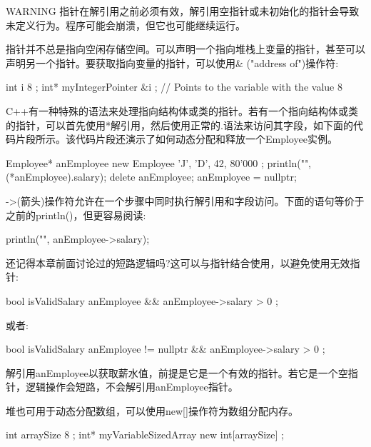 \begin{myWarning}{WARNING}
指针在解引用之前必须有效，解引用空指针或未初始化的指针会导致未定义行为。程序可能会崩溃，但它也可能继续运行。
\end{myWarning}

指针并不总是指向空闲存储空间。可以声明一个指向堆栈上变量的指针，甚至可以声明另一个指针。要获取指向变量的指针，可以使用\& ("address of")操作符:

\begin{cpp}
int i { 8 };
int* myIntegerPointer { &i }; // Points to the variable with the value 8
\end{cpp}

C++有一种特殊的语法来处理指向结构体或类的指针。若有一个指向结构体或类的指针，可以首先使用*解引用，然后使用正常的.语法来访问其字段，如下面的代码片段所示。该代码片段还演示了如何动态分配和释放一个Employee实例。

\begin{cpp}
Employee* anEmployee { new Employee { 'J', 'D', 42, 80'000 } };
println("{}", (*anEmployee).salary);
delete anEmployee; anEmployee = nullptr;
\end{cpp}

->(箭头)操作符允许在一个步骤中同时执行解引用和字段访问。下面的语句等价于之前的println()，但更容易阅读:

\begin{cpp}
println("{}", anEmployee->salary);
\end{cpp}

还记得本章前面讨论过的短路逻辑吗?这可以与指针结合使用，以避免使用无效指针:

\begin{cpp}
bool isValidSalary { anEmployee && anEmployee->salary > 0 };
\end{cpp}

或者:

\begin{cpp}
bool isValidSalary { anEmployee != nullptr && anEmployee->salary > 0 };
\end{cpp}

解引用anEmployee以获取薪水值，前提是它是一个有效的指针。若它是一个空指针，逻辑操作会短路，不会解引用anEmployee指针。


堆也可用于动态分配数组，可以使用new[]操作符为数组分配内存。

\begin{cpp}
int arraySize { 8 };
int* myVariableSizedArray { new int[arraySize] };
\end{cpp}

